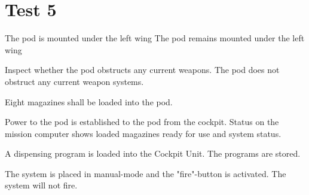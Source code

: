 \documentclass[Main]{subfiles}
\begin{document}
\newpage
\section{Test 5}

\begin{TestCaseIntro}
\end{TestCaseIntro}

\begin{TestCase}
\TC
{The pod is mounted under the left wing}
{The pod remains mounted under the left wing}

\TC
{Inspect whether the pod obstructs any current weapons.}
{The pod does not obstruct any current weapon systems.}

\TC
{Eight magazines shall be loaded into the pod.}
{}

\TC
{Power to the pod is established to the pod from the cockpit.}
{Status on the mission computer shows loaded magazines ready for use and system status.}

\TC
{A dispensing program is loaded into the Cockpit Unit.}
{The programs are stored.}

\TC
{The system is placed in manual-mode and the "fire"-button is activated.}
{The system will not fire.}
\\

\end{TestCase}
\end{document}
